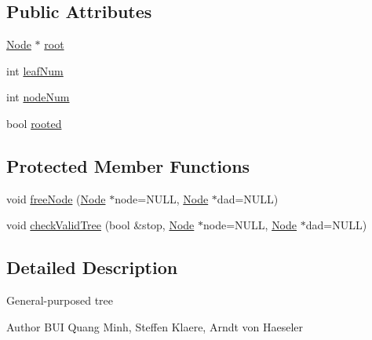 \subsection*{Public Attributes}
\begin{DoxyCompactItemize}
\item 
\hyperlink{classNode}{Node} $\ast$ \hyperlink{classMTree_af29314a803a9e49bdddd4f5e374bd35e}{root}
\item 
int \hyperlink{classMTree_a8fe3d41dd96bf4507c60f2c73dcb1026}{leafNum}
\item 
int \hyperlink{classMTree_a1b8904ca0e0218081a92233cbe21478c}{nodeNum}
\item 
bool \hyperlink{classMTree_ae9131924ff162d9cda80333b6f6242b4}{rooted}
\end{DoxyCompactItemize}
\subsection*{Protected Member Functions}
\begin{DoxyCompactItemize}
\item 
void \hyperlink{classMTree_ad81304aa2535e3e43f28eadcb5471c07}{freeNode} (\hyperlink{classNode}{Node} $\ast$node=NULL, \hyperlink{classNode}{Node} $\ast$dad=NULL)
\item 
void \hyperlink{classMTree_a4ba0e04e2f9a71b98eb2c640a1931fa7}{checkValidTree} (bool \&stop, \hyperlink{classNode}{Node} $\ast$node=NULL, \hyperlink{classNode}{Node} $\ast$dad=NULL)
\end{DoxyCompactItemize}


\subsection{Detailed Description}
General-\/purposed tree \begin{DoxyAuthor}{Author}
BUI Quang Minh, Steffen Klaere, Arndt von Haeseler 
\end{DoxyAuthor}


